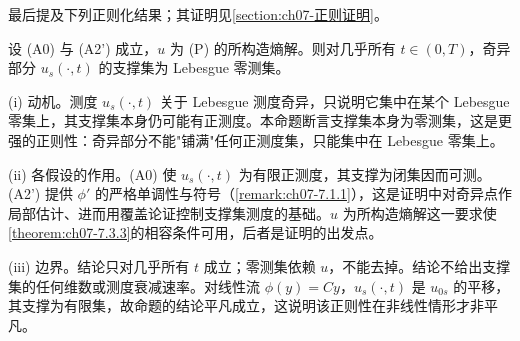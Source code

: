 \documentclass[../../main.tex]{subfiles}%
\begin{document}
最后提及下列正则化结果；其证明见\cref{section:ch07-正则证明}。

\begin{proposition}\label{proposition:ch07-7.3.5}
设 (A0) 与 (A2') 成立，$u$ 为 (P) 的所构造熵解。则对几乎所有 $t\in(0,T)$，奇异部分 $u_s(\cdot,t)$ 的支撑集为 Lebesgue 零测集。
\end{proposition}

\begin{remark}\label{remark:ch07-7.3.5动机}
(i) 动机。测度 $u_s(\cdot,t)$ 关于 Lebesgue 测度奇异，只说明它集中在某个 Lebesgue 零集上，其支撑集本身仍可能有正测度。本命题断言支撑集本身为零测集，这是更强的正则性：奇异部分不能"铺满"任何正测度集，只能集中在 Lebesgue 零集上。

(ii) 各假设的作用。(A0) 使 $u_s(\cdot,t)$ 为有限正测度，其支撑为闭集因而可测。(A2') 提供 $\phi'$ 的严格单调性与符号（\cref{remark:ch07-7.1.1}），这是证明中对奇异点作局部估计、进而用覆盖论证控制支撑集测度的基础。$u$ 为所构造熵解这一要求使\cref{theorem:ch07-7.3.3}的相容条件可用，后者是证明的出发点。

(iii) 边界。结论只对几乎所有 $t$ 成立；零测集依赖 $u$，不能去掉。结论不给出支撑集的任何维数或测度衰减速率。对线性流 $\phi(y)=Cy$，$u_s(\cdot,t)$ 是 $u_{0s}$ 的平移，其支撑为有限集，故命题的结论平凡成立，这说明该正则性在非线性情形才非平凡。
\end{remark}
\end{document}
